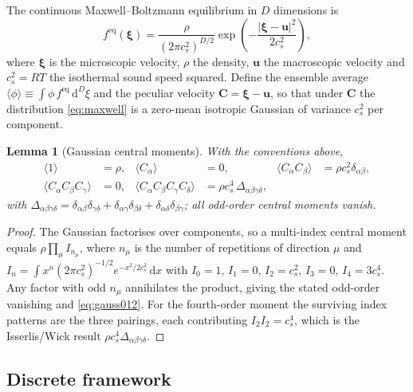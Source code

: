 \documentclass[preprint,11pt]{elsarticle}
\newtheorem{lemma}{Lemma}
\newcommand{\cs}{c_s}
\newcommand{\eq}{\mathrm{eq}}
\newcommand{\dd}{\,\mathrm{d}}
\newcommand{\Deltafour}{\Delta_{\alpha\beta\gamma\delta}}
\begin{document}
The continuous Maxwell--Boltzmann equilibrium in $D$ dimensions is
\begin{equation}
f^{\eq}(\boldsymbol{\xi})
=\frac{\rho}{(2\pi \cs^{2})^{D/2}}
\exp\!\left(-\frac{|\boldsymbol{\xi}-\mathbf{u}|^{2}}{2\cs^{2}}\right),
\label{eq:maxwell}
\end{equation}
where $\boldsymbol{\xi}$ is the microscopic velocity, $\rho$ the density,
$\mathbf{u}$ the macroscopic velocity and $\cs^{2}=RT$ the isothermal sound
speed squared. Define the ensemble average
$\langle\phi\rangle\equiv\int \phi\, f^{\eq}\dd^{D}\xi$ and the peculiar
velocity $\mathbf{C}=\boldsymbol{\xi}-\mathbf{u}$, so that under $\mathbf{C}$
the distribution \eqref{eq:maxwell} is a zero-mean isotropic Gaussian of
variance $\cs^{2}$ per component.

\begin{lemma}[Gaussian central moments]
\label{lem:gauss}
With the conventions above,
\begin{align}
\langle 1\rangle &= \rho, &
\langle C_\alpha\rangle &= 0, &
\langle C_\alpha C_\beta\rangle &= \rho \cs^{2}\delta_{\alpha\beta},
\label{eq:gauss012}\\
\langle C_\alpha C_\beta C_\gamma\rangle &= 0, &
\langle C_\alpha C_\beta C_\gamma C_\delta\rangle
&= \rho \cs^{4}\,\Deltafour, & &
\label{eq:gauss34}
\end{align}
with $\Deltafour=\delta_{\alpha\beta}\delta_{\gamma\delta}
+\delta_{\alpha\gamma}\delta_{\beta\delta}
+\delta_{\alpha\delta}\delta_{\beta\gamma}$; all odd-order central moments
vanish.
\end{lemma}

\begin{proof}
The Gaussian factorises over components, so a multi-index central moment
equals $\rho\prod_{\mu}I_{n_\mu}$, where $n_\mu$ is the number of repetitions
of direction $\mu$ and $I_{n}=\int x^{n}(2\pi\cs^{2})^{-1/2}
e^{-x^{2}/2\cs^{2}}\dd x$ with $I_0=1$, $I_1=0$, $I_2=\cs^{2}$, $I_3=0$,
$I_4=3\cs^{4}$. Any factor with odd $n_\mu$ annihilates the product, giving
the stated odd-order vanishing and \eqref{eq:gauss012}. For the fourth-order
moment the surviving index patterns are the three pairings, each contributing
$I_2 I_2=\cs^{4}$, which is the Isserlis/Wick result $\rho\cs^{4}\Deltafour$.
\end{proof}

\subsection{Discrete framework}
\end{document}
